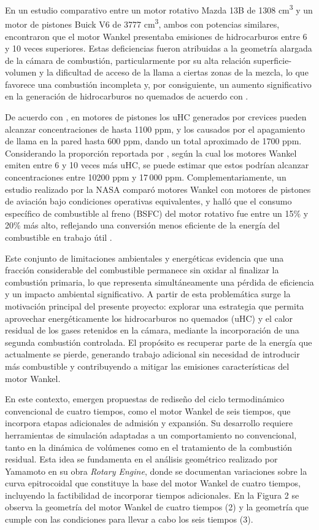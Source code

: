 \documentclass{LS}
\begin{document}
En un estudio comparativo entre un motor rotativo Mazda 13B de 1308 cm\textsuperscript{3} y un motor de pistones Buick V6 de 3777 cm\textsuperscript{3}, ambos con potencias similares, \cite{cole1976} encontraron que el motor Wankel presentaba emisiones de hidrocarburos entre 6 y 10 veces superiores. Estas deficiencias fueron atribuidas a la geometría alargada de la cámara de combustión, particularmente por su alta relación superficie-volumen y la dificultad de acceso de la llama a ciertas zonas de la mezcla, lo que favorece una combustión incompleta y, por consiguiente, un aumento significativo en la generación de hidrocarburos no quemados de acuerdo con \cite{yamamoto1972}.


De acuerdo con \cite{kuppa2019}, en motores de pistones los uHC generados por crevices pueden alcanzar concentraciones de hasta 1100 ppm, y los causados por el apagamiento de llama en la pared hasta 600 ppm, dando un total aproximado de 1700 ppm. Considerando la proporción reportada por \cite{cole1976}, según la cual los motores Wankel emiten entre 6 y 10 veces más uHC, se puede estimar que estos podrían alcanzar concentraciones entre 10200 ppm y 17\,000 ppm. Complementariamente, un estudio realizado por la NASA comparó motores Wankel con motores de pistones de aviación bajo condiciones operativas equivalentes, y halló que el consumo específico de combustible al freno (BSFC) del motor rotativo fue entre un 15\% y 20\% más alto, reflejando una conversión menos eficiente de la energía del combustible en trabajo útil \cite{nasa1984}.

Este conjunto de limitaciones ambientales y energéticas evidencia que una fracción considerable del combustible permanece sin oxidar al finalizar la combustión primaria, lo que representa simultáneamente una pérdida de eficiencia y un impacto ambiental significativo. A partir de esta problemática surge la motivación principal del presente proyecto: explorar una estrategia que permita aprovechar energéticamente los hidrocarburos no quemados (uHC) y el calor residual de los gases retenidos en la cámara, mediante la incorporación de una segunda combustión controlada. El propósito es recuperar parte de la energía que actualmente se pierde, generando trabajo adicional sin necesidad de introducir más combustible y contribuyendo a mitigar las emisiones características del motor Wankel.

En este contexto, emergen propuestas de rediseño del ciclo termodinámico convencional de cuatro tiempos, como el motor Wankel de seis tiempos, que incorpora etapas adicionales de admisión y expansión. Su desarrollo requiere herramientas de simulación adaptadas a un comportamiento no convencional, tanto en la dinámica de volúmenes como en el tratamiento de la combustión residual. Esta idea se fundamenta en el análisis geométrico realizado por Yamamoto en su obra \textit{Rotary Engine}, donde se documentan variaciones sobre la curva epitrocoidal que constituye la base del motor Wankel de cuatro tiempos, incluyendo la factibilidad de incorporar tiempos adicionales. En la Figura 2 se observa la geometría del motor Wankel de cuatro tiempos (2) y la geometría que cumple con las condiciones para llevar a cabo los seis tiempos (3).
\end{document}
